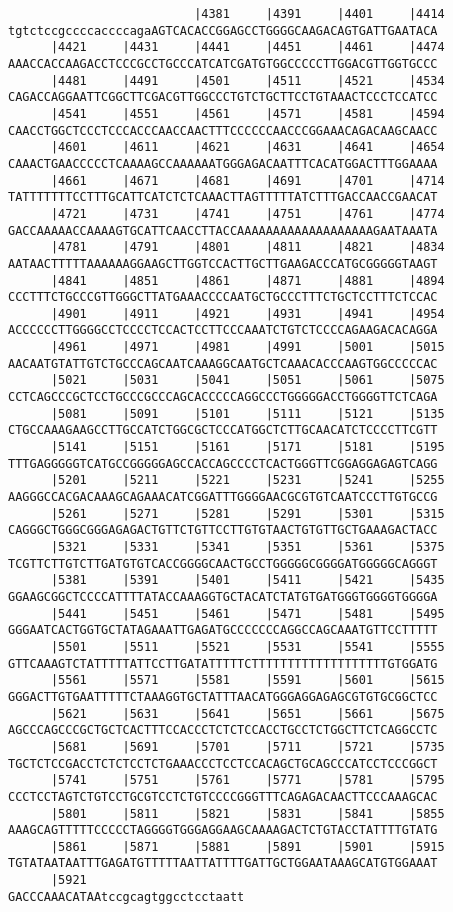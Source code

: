 \documentclass{article}
\begin{document}
\begin{Verbatim}
                          |4381     |4391     |4401     |4414
tgtctccgccccaccccagaAGTCACACCGGAGCCTGGGGCAAGACAGTGATTGAATACA
      |4421     |4431     |4441     |4451     |4461     |4474
AAACCACCAAGACCTCCCGCCTGCCCATCATCGATGTGGCCCCCTTGGACGTTGGTGCCC
      |4481     |4491     |4501     |4511     |4521     |4534
CAGACCAGGAATTCGGCTTCGACGTTGGCCCTGTCTGCTTCCTGTAAACTCCCTCCATCC
      |4541     |4551     |4561     |4571     |4581     |4594
CAACCTGGCTCCCTCCCACCCAACCAACTTTCCCCCCAACCCGGAAACAGACAAGCAACC
      |4601     |4611     |4621     |4631     |4641     |4654
CAAACTGAACCCCCTCAAAAGCCAAAAAATGGGAGACAATTTCACATGGACTTTGGAAAA
      |4661     |4671     |4681     |4691     |4701     |4714
TATTTTTTTCCTTTGCATTCATCTCTCAAACTTAGTTTTTATCTTTGACCAACCGAACAT
      |4721     |4731     |4741     |4751     |4761     |4774
GACCAAAAACCAAAAGTGCATTCAACCTTACCAAAAAAAAAAAAAAAAAAAGAATAAATA
      |4781     |4791     |4801     |4811     |4821     |4834
AATAACTTTTTAAAAAAGGAAGCTTGGTCCACTTGCTTGAAGACCCATGCGGGGGTAAGT
      |4841     |4851     |4861     |4871     |4881     |4894
CCCTTTCTGCCCGTTGGGCTTATGAAACCCCAATGCTGCCCTTTCTGCTCCTTTCTCCAC
      |4901     |4911     |4921     |4931     |4941     |4954
ACCCCCCTTGGGGCCTCCCCTCCACTCCTTCCCAAATCTGTCTCCCCAGAAGACACAGGA
      |4961     |4971     |4981     |4991     |5001     |5015
AACAATGTATTGTCTGCCCAGCAATCAAAGGCAATGCTCAAACACCCAAGTGGCCCCCAC
      |5021     |5031     |5041     |5051     |5061     |5075
CCTCAGCCCGCTCCTGCCCGCCCAGCACCCCCAGGCCCTGGGGGACCTGGGGTTCTCAGA
      |5081     |5091     |5101     |5111     |5121     |5135
CTGCCAAAGAAGCCTTGCCATCTGGCGCTCCCATGGCTCTTGCAACATCTCCCCTTCGTT
      |5141     |5151     |5161     |5171     |5181     |5195
TTTGAGGGGGTCATGCCGGGGGAGCCACCAGCCCCTCACTGGGTTCGGAGGAGAGTCAGG
      |5201     |5211     |5221     |5231     |5241     |5255
AAGGGCCACGACAAAGCAGAAACATCGGATTTGGGGAACGCGTGTCAATCCCTTGTGCCG
      |5261     |5271     |5281     |5291     |5301     |5315
CAGGGCTGGGCGGGAGAGACTGTTCTGTTCCTTGTGTAACTGTGTTGCTGAAAGACTACC
      |5321     |5331     |5341     |5351     |5361     |5375
TCGTTCTTGTCTTGATGTGTCACCGGGGCAACTGCCTGGGGGCGGGGATGGGGGCAGGGT
      |5381     |5391     |5401     |5411     |5421     |5435
GGAAGCGGCTCCCCATTTTATACCAAAGGTGCTACATCTATGTGATGGGTGGGGTGGGGA
      |5441     |5451     |5461     |5471     |5481     |5495
GGGAATCACTGGTGCTATAGAAATTGAGATGCCCCCCCAGGCCAGCAAATGTTCCTTTTT
      |5501     |5511     |5521     |5531     |5541     |5555
GTTCAAAGTCTATTTTTATTCCTTGATATTTTTCTTTTTTTTTTTTTTTTTTTGTGGATG
      |5561     |5571     |5581     |5591     |5601     |5615
GGGACTTGTGAATTTTTCTAAAGGTGCTATTTAACATGGGAGGAGAGCGTGTGCGGCTCC
      |5621     |5631     |5641     |5651     |5661     |5675
AGCCCAGCCCGCTGCTCACTTTCCACCCTCTCTCCACCTGCCTCTGGCTTCTCAGGCCTC
      |5681     |5691     |5701     |5711     |5721     |5735
TGCTCTCCGACCTCTCTCCTCTGAAACCCTCCTCCACAGCTGCAGCCCATCCTCCCGGCT
      |5741     |5751     |5761     |5771     |5781     |5795
CCCTCCTAGTCTGTCCTGCGTCCTCTGTCCCCGGGTTTCAGAGACAACTTCCCAAAGCAC
      |5801     |5811     |5821     |5831     |5841     |5855
AAAGCAGTTTTTCCCCCTAGGGGTGGGAGGAAGCAAAAGACTCTGTACCTATTTTGTATG
      |5861     |5871     |5881     |5891     |5901     |5915
TGTATAATAATTTGAGATGTTTTTAATTATTTTGATTGCTGGAATAAAGCATGTGGAAAT
      |5921                      
GACCCAAACATAAtccgcagtggcctcctaatt
\end{Verbatim}
\end{document}
